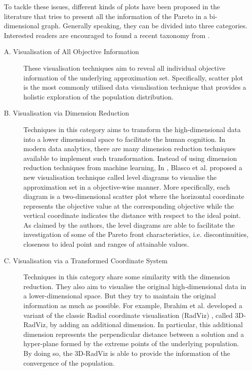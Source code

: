 To tackle these issues, different kinds of plots have been proposed in the literature that tries to present all the information of the Pareto in a bi-dimensional graph. Generally speaking, they can be divided into three categories. Interested readers are encouraged to found a recent taxonomy from \citet{B.2018}.

\begin{description}
\item [A. Visualisation of All Objective Information] These visualisation techniques aim to reveal all individual objective information of the underlying approximation set. Specifically, scatter plot is the most commonly utilised data visualisation technique that provides a holistic exploration of the population distribution. 

\item [B. Visualisation via Dimension Reduction] Techniques in this category aims to transform the high-dimensional data into a lower dimensional space to facilitate the human cognition. In modern data analytics, there are many dimension reduction techniques available to implement such transformation.  Instead of using dimension reduction techniques from machine learning, In \citet{Blasco2008}, Blasco et al. proposed a new visualisation technique called level diagrams to visualise the approximation set in a objective-wise manner. More specifically, each diagram is a two-dimensional scatter plot where the horizontal coordinate represents the objective value at the corresponding objective while the vertical coordinate indicates the distance with respect to the ideal point. As claimed by the authors, the level diagrams are able to facilitate the investigation of some of the Pareto front characteristics, i.e. discontinuities, closeness to ideal point and ranges of attainable values. 

\item [C. Visualisation via a Transformed Coordinate System] Techniques in this category share some similarity with the dimension reduction. They also aim to visualise the original high-dimensional data in a lower-dimensional space. But they try to maintain the original information as much as possible. For example, Ibrahim et al. \citet{Ibrahim2016} developed a variant of the classic Radial coordinate visualisation (RadViz) \citep{Hoffman2002}, called 3D-RadViz, by adding an additional dimension. In particular, this additional dimension represents the perpendicular distance between a solution and a hyper-plane formed by the extreme points of the underlying population. By doing so, the 3D-RadViz is able to provide the information of the convergence of the population. 
\end{description}

